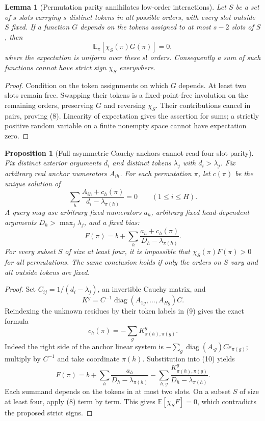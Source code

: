 \documentclass[11pt]{article}
\newtheorem{lemma}[theorem]{Lemma}
\newtheorem{proposition}[theorem]{Proposition}
\begin{document}
\begin{lemma}[Permutation parity annihilates low-order interactions]
Let $S$ be a set of $s$ slots carrying $s$ distinct tokens in all
possible orders, with every slot outside $S$ fixed. If a function $G$
depends on the tokens assigned to at most $s-2$ slots of $S$, then
\[
 \mathbb E_\pi[\chi_S(\pi)G(\pi)]=0,
 \tag{8}
\]
where the expectation is uniform over these $s!$ orders. Consequently
a sum of such functions cannot have strict sign $\chi_S$ everywhere.
\end{lemma}
\begin{proof}
Condition on the token assignments on which $G$ depends. At least
two slots remain free. Swapping their tokens is a fixed-point-free
involution on the remaining orders, preserving $G$ and reversing
$\chi_S$. Their contributions cancel in pairs, proving (8).
Linearity of expectation gives the assertion for sums; a strictly
positive random variable on a finite nonempty space cannot have
expectation zero.
\end{proof}

\begin{proposition}[Full asymmetric Cauchy anchors cannot read four-slot parity]
Fix distinct exterior arguments $d_i$ and distinct tokens $\lambda_j$
with $d_i>\lambda_j$. Fix arbitrary real anchor numerators $A_{ih}$.
For each permutation $\pi$, let $c(\pi)$ be the unique solution of
\[
 \sum_h\frac{A_{ih}+c_h(\pi)}{d_i-\lambda_{\pi(h)}}=0
 \qquad(1\leq i\leq H).
 \tag{9}
\]
A query may use arbitrary fixed numerators $a_h$, arbitrary fixed
head-dependent arguments $D_h>\max_j\lambda_j$, and a fixed bias:
\[
 F(\pi)=b+\sum_h\frac{a_h+c_h(\pi)}{D_h-\lambda_{\pi(h)}}.
 \tag{10}
\]
For every subset $S$ of size at least four, it is impossible that
$\chi_S(\pi)F(\pi)>0$ for all permutations. The same conclusion holds
if only the orders on $S$ vary and all outside tokens are fixed.
\end{proposition}
\begin{proof}
Set $C_{ij}=1/(d_i-\lambda_j)$, an invertible Cauchy matrix, and
\[
 K^g=C^{-1}\operatorname{diag}(A_{1g},\ldots,A_{Hg})C.
\]
Reindexing the unknown residues by their token labels in (9) gives
the exact formula
\[
 c_h(\pi)=-\sum_gK^g_{\pi(h),\pi(g)}.
 \tag{11}
\]
Indeed the right side of the anchor linear system is
$-\sum_g\operatorname{diag}(A_{\cdot g})Ce_{\pi(g)}$; multiply
by $C^{-1}$ and take coordinate $\pi(h)$.
Substitution into (10) yields
\[
 F(\pi)=b+\sum_h\frac{a_h}{D_h-\lambda_{\pi(h)}}
 -\sum_{h,g}
       \frac{K^g_{\pi(h),\pi(g)}}{D_h-\lambda_{\pi(h)}}.
 \tag{12}
\]
Each summand depends on the tokens in at most two slots. On a subset
$S$ of size at least four, apply (8) term by term. This gives
$\mathbb E[\chi_SF]=0$, which contradicts the proposed strict signs.
\end{proof}
\end{document}
